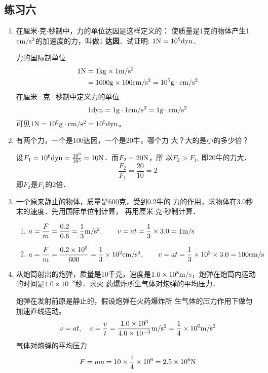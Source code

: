 \subsection{练习六}
\begin{enumerate}
\item 在厘米$\cdot$克$\cdot$秒制中，力的单位达因是这样定义的：
使质量是1克的物体产生1${\rm cm}/{\rm s^2}$的加速度的力，叫做1
\textbf{达因}．试证明: $1{\rm N}=10^5{\rm dyn}$．
	 
\begin{solution}
    力的国际制单位
\[\begin{split}
    1{\rm N}&=1{\rm kg}\times 1\text{m}/\text{s}^2\\
    &=1000{\rm g}\times 100{\rm cm/s^2}=10^5{\rm g\cdot cm/s^2}
\end{split}\]
在厘米·克·秒制中定义力的单位
\[1{\rm dyn}=1{\rm g}\cdot 1{\rm cm/s^2}=1{\rm g\cdot cm/s^2}\]
可见$1{\rm N}=10^5{\rm g\cdot cm/s^2}=10^5{\rm dyn}$。
\end{solution}
\item 有两个力，一个是100达因，一个是20牛，哪个力
大？大的是小的多少倍？
	 
\begin{solution}
    设$F_1=10^6{\rm dyn}=\frac{10^6}{10^5}=10{\rm N}$．而$F_2=20{\rm N}$，所
以$F_2>F_1$, 即20牛的力大．
\[\frac{F_2}{F_1}=\frac{20}{10}=2\]
即$F_2$是$F_1$的2倍．
\end{solution}
\item 一个原来静止的物体，质量是600克，受到0.2牛的
力的作用，求物体在3.0秒末的速度．先用国际单位制计算，
再用厘米$\cdot$克$\cdot$秒制计算．
	 
\begin{solution}
\begin{enumerate}
    \item $a=\dfrac{F}{m}=\dfrac{0.2}{0.6}=\dfrac{1}{3}\text{m}/\text{s}^2,\qquad v=at=\dfrac{1}{3}\times 3.0=1\text{m}/\text{s}$
\item $a=\dfrac{F}{m}=\dfrac{0.2\times 10^5}{600}=\dfrac{1}{3}\times 10^2{\rm cm/s^2},\qquad v=at=\dfrac{1}{3}\times 10^2\times 3.0=100{\rm cm/s}$
\end{enumerate}
\end{solution}
\item 从炮筒射出的炮弹，质量是10千克，速度是$1.0\times 
10^8\text{m}/\text{s}$，炮弹在炮筒内运动的时间是$4.0\times 10^{-8}$秒．求火
药爆炸所生气体对炮弹的平均压力．

\begin{solution}	 
    炮弹在发射前原是静止的，假设炮弹在火药爆炸所
    生气体的压力作用下做匀加速直线运动。
\[v=at,\quad a=\frac{v}{t}=\frac{1.0\times 10^3}{4.0\times 10^{-3}}\text{m}/\text{s}^2=\frac{1}{4}\times 10^6\text{m}/\text{s}^2\]
气体对炮弹的平均压力
\[F=ma=10\times\frac{1}{4}\times 10^6=2.5\times 10^6{\rm N}\]
\end{solution}
\end{enumerate}



